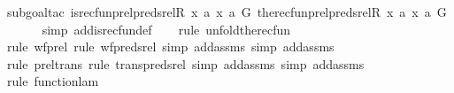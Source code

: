 \begin{isabellebody}
{\isacharparenleft}{\kern0pt}subgoal{\isacharunderscore}{\kern0pt}tac\ {\isachardoublequoteopen}is{\isacharunderscore}{\kern0pt}recfun{\isacharparenleft}{\kern0pt}prel{\isacharparenleft}{\kern0pt}preds{\isacharunderscore}{\kern0pt}rel{\isacharparenleft}{\kern0pt}R{\isacharcomma}{\kern0pt}\ x{\isacharparenright}{\kern0pt}{\isacharcomma}{\kern0pt}\ {\isacharbraceleft}{\kern0pt}a{\isacharbraceright}{\kern0pt}{\isacharparenright}{\kern0pt}{\isacharcomma}{\kern0pt}\ {\isacharless}{\kern0pt}x{\isacharcomma}{\kern0pt}\ a{\isachargreater}{\kern0pt}{\isacharcomma}{\kern0pt}\ G{\isacharcomma}{\kern0pt}\ the{\isacharunderscore}{\kern0pt}recfun{\isacharparenleft}{\kern0pt}prel{\isacharparenleft}{\kern0pt}preds{\isacharunderscore}{\kern0pt}rel{\isacharparenleft}{\kern0pt}R{\isacharcomma}{\kern0pt}\ x{\isacharparenright}{\kern0pt}{\isacharcomma}{\kern0pt}\ {\isacharbraceleft}{\kern0pt}a{\isacharbraceright}{\kern0pt}{\isacharparenright}{\kern0pt}{\isacharcomma}{\kern0pt}\ {\isasymlangle}x{\isacharcomma}{\kern0pt}\ a{\isasymrangle}{\isacharcomma}{\kern0pt}\ G{\isacharparenright}{\kern0pt}{\isacharparenright}{\kern0pt}{\isachardoublequoteclose}{\isacharparenright}{\kern0pt}\ \isanewline
\ \ \ \ \isamarkupfalse%
\ {\isacharparenleft}{\kern0pt}simp\ add{\isacharcolon}{\kern0pt}is{\isacharunderscore}{\kern0pt}recfun{\isacharunderscore}{\kern0pt}def{\isacharparenright}{\kern0pt}\isanewline
\ \ \ \isamarkupfalse%
{\isacharparenleft}{\kern0pt}rule\ unfold{\isacharunderscore}{\kern0pt}the{\isacharunderscore}{\kern0pt}recfun{\isacharparenright}{\kern0pt}\isanewline
\ \ \ \ \isamarkupfalse%
{\isacharparenleft}{\kern0pt}rule\ wf{\isacharunderscore}{\kern0pt}prel{\isacharcomma}{\kern0pt}\ rule\ wf{\isacharunderscore}{\kern0pt}preds{\isacharunderscore}{\kern0pt}rel{\isacharcomma}{\kern0pt}\ simp\ add{\isacharcolon}{\kern0pt}assms{\isacharcomma}{\kern0pt}\ simp\ add{\isacharcolon}{\kern0pt}assms{\isacharparenright}{\kern0pt}\isanewline
\ \ \ \isamarkupfalse%
{\isacharparenleft}{\kern0pt}rule\ prel{\isacharunderscore}{\kern0pt}trans{\isacharcomma}{\kern0pt}\ rule\ trans{\isacharunderscore}{\kern0pt}preds{\isacharunderscore}{\kern0pt}rel{\isacharcomma}{\kern0pt}\ simp\ add{\isacharcolon}{\kern0pt}assms{\isacharcomma}{\kern0pt}\ simp\ add{\isacharcolon}{\kern0pt}assms{\isacharparenright}{\kern0pt}\isanewline
\ \ \isamarkupfalse%
{\isacharparenleft}{\kern0pt}rule\ function{\isacharunderscore}{\kern0pt}lam{\isacharparenright}{\kern0pt}\isanewline
\ \ \isamarkupfalse%
%
\endisatagproof
{\isafoldproof}%
%
\isadelimproof
\isanewline
%
\endisadelimproof
\isanewline
{}\isamarkupfalse%
\isanewline
%
\isadelimtheory
%
\endisadelimtheory
%
\isatagtheory
{}\isamarkupfalse%
%
\endisatagtheory
{\isafoldtheory}%
%
\isadelimtheory
%
\endisadelimtheory
%
\end{isabellebody}%
